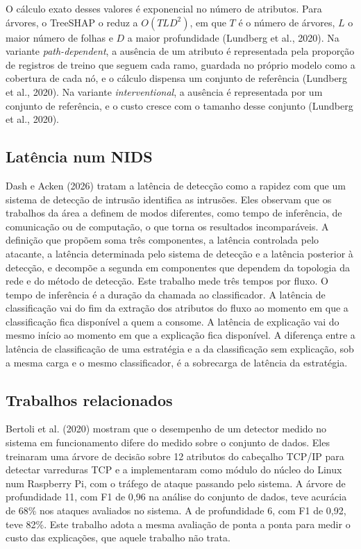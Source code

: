\documentclass[
  article,
  12pt,
  oneside,
  a4paper,
  english,
  brazil
]{abntex2}
\begin{document}
O cálculo exato desses valores é exponencial no número de atributos. Para árvores, o TreeSHAP o
reduz a $O(TLD^2)$, em que $T$ é o número de árvores, $L$ o maior número de folhas e $D$ a maior
profundidade (Lundberg et al., 2020). Na variante \emph{path-dependent}, a ausência de um atributo é
representada pela proporção de registros de treino que seguem cada ramo, guardada no próprio modelo
como a cobertura de cada nó, e o cálculo dispensa um conjunto de referência (Lundberg et al.,
2020). Na variante
\emph{interventional}, a ausência é representada por um conjunto de referência, e o custo cresce
com o tamanho desse conjunto (Lundberg et al., 2020).

\subsection{Latência num NIDS}

Dash e Acken (2026) tratam a latência de detecção como a rapidez com que um sistema de detecção de
intrusão identifica as intrusões. Eles observam que os trabalhos da área a definem de modos
diferentes, como tempo de inferência, de comunicação ou de computação, o que torna os resultados
incomparáveis. A definição que propõem soma três componentes, a latência controlada pelo atacante,
a latência determinada pelo sistema de detecção e a latência posterior à detecção, e decompõe a
segunda em componentes que dependem da topologia da rede e do método de detecção.
Este trabalho mede três tempos por fluxo. O tempo de inferência é a duração da chamada ao
classificador. A latência de classificação vai do fim da extração dos atributos do fluxo ao momento
em que a classificação fica disponível a quem a consome. A latência de explicação vai do mesmo
início ao momento em que a explicação fica disponível. A diferença entre a latência de
classificação de uma estratégia e a da classificação sem explicação, sob a mesma carga e o mesmo
classificador, é a sobrecarga de latência da estratégia.

\subsection{Trabalhos relacionados}

Bertoli et al. (2020) mostram que o desempenho de um detector medido no sistema em funcionamento
difere do medido sobre o conjunto de dados. Eles treinaram uma árvore de decisão sobre 12 atributos
do cabeçalho TCP/IP para detectar varreduras TCP e a implementaram como módulo do núcleo do Linux num
Raspberry Pi, com o tráfego de ataque passando pelo sistema. A árvore de profundidade 11, com F1 de
0,96 na análise do conjunto de dados, teve acurácia de 68\% nos ataques avaliados no sistema. A de
profundidade 6, com F1 de 0,92, teve 82\%. Este trabalho adota a mesma avaliação de ponta a ponta
para medir o custo das explicações, que aquele trabalho não trata.
\end{document}

